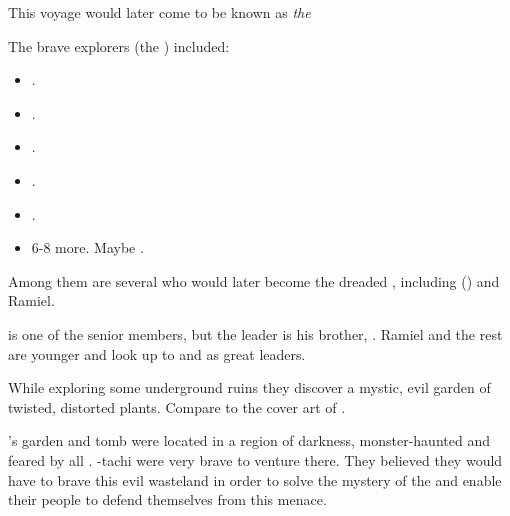 This voyage would later come to be known as \emph{the \Delving}

The brave explorers (the \quo{\Delvers}) included: 

\begin{itemize}
  \item \Damiarch.
  \item \Gevural.
  \item \Zachirah.
  \item \Ramiel.
  \item \Shiaraid.
  \item 6-8 more. Maybe \Sithiyacaan.
\end{itemize}

Among them are several who would later become the dreaded \satharioth, including \Gevural{} (\Azraid{}) and Ramiel. 

\Gevural{} is one of the senior members, but the leader is his brother, \Damiarch. Ramiel and the rest are younger and look up to \Damiarch{} and \Gevural{} as great leaders. 

While exploring some underground ruins they discover a mystic, evil garden of twisted, distorted plants. 
Compare to the cover art of . 

\Semiza's garden and tomb were located in a region of darkness, monster-haunted and feared by all \resphain.
\Damiarch-tachi were very brave to venture there.
They believed they would have to brave this evil wasteland in order to solve the mystery of the \umbrae and enable their people to defend themselves from this menace.


